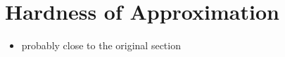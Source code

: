 \section{Hardness of Approximation}
\label{sec:hardness}

\begin{itemize}
	\item
	probably close to the original section
\end{itemize}

\lipsum[29-34]

